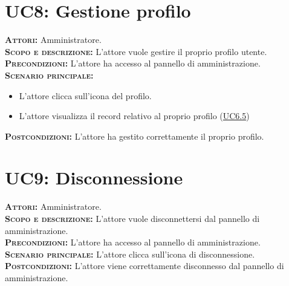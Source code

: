 \section{UC8: Gestione profilo}
\label{sec:UC8}
\textsc{\textbf{Attori:}} Amministratore.\\
\textsc{\textbf{Scopo e descrizione:}} L'attore vuole gestire il proprio profilo utente.\\
\textsc{\textsc{\textbf{Precondizioni:}}} L'attore ha accesso al pannello di amministrazione.\\
\textsc{\textbf{Scenario principale:}}
\begin{itemize}
    \item L'attore clicca sull'icona del profilo.
    \item L'attore visualizza il record relativo al proprio profilo (\hyperref[sec:UC65]{UC6.5})
\end{itemize}
\textsc{\textbf{Postcondizioni:}} L'attore ha gestito correttamente il proprio profilo.

\section{UC9: Disconnessione}
\label{sec:UC9}
\textsc{\textbf{Attori:}} Amministratore.\\
\textsc{\textbf{Scopo e descrizione:}} L'attore vuole disconnettersi dal pannello di amministrazione.\\
\textsc{\textsc{\textbf{Precondizioni:}}} L'attore ha accesso al pannello di amministrazione.\\
\textsc{\textbf{Scenario principale:}} L'attore clicca sull'icona di disconnessione.\\
\textsc{\textbf{Postcondizioni:}} L'attore viene correttamente disconnesso dal pannello di amministrazione.


